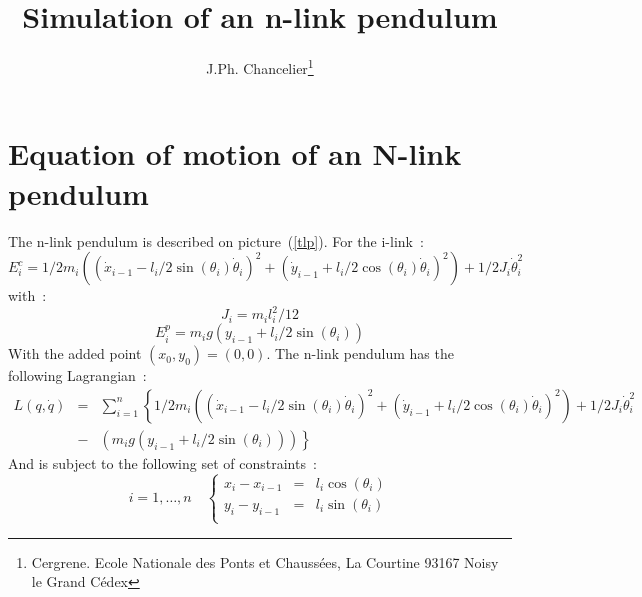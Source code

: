              \textheight=660pt 
             \textwidth=15cm
             \topmargin=-27pt 
             \oddsidemargin=0.7cm
             \evensidemargin=0.7cm
             \marginparwidth=60pt
             \title{Simulation of an n-link pendulum} 
             \author{J.Ph. Chancelier\thanks{Cergrene. Ecole Nationale des Ponts et Chauss\'ees, La Courtine  93167 Noisy le Grand C\'{e}dex }}
 
\maketitle

\def\tenrm{\size{10}{11pt}\shape{n}\family{cmr}\selectfont} 
\def\elvrm{\size{11}{12pt}\shape{n}\family{cmr}\selectfont} 
\def\sixrm{\size{6}{7pt}\shape{n}\family{cmr}\selectfont} 
\def\sevrm{\size{7}{8pt}\shape{n}\family{cmr}\selectfont} 
\def\dotx{\dot{x}}
\def\doty{\dot{y}}
\def\dotq{\dot{q}}
\def\dotth{\dot{\theta}}



\section{Equation of motion of an N-link pendulum}
The n-link pendulum is described on picture~(\ref{tlp}).
For the i-link~:
\begin{equation}
	E_i^c = 
	 1/2 m_i \left( (\dotx_{i-1} - l_i/2 \sin(\theta_i)\dotth_i)^2 +
	(\doty_{i-1}+ l_i/2 \cos(\theta_i)\dotth_i)^2 \right)
	+1/2 J_i \dot{\theta}_i^2
\end{equation}
with~:
\begin{equation}
	J_i= m_i l_i^2/12 
\end{equation}
\begin{equation}
	E_i^p= m_i g \left( y_{i-1} + l_i/2 \sin(\theta_i)\right)
\end{equation}
With the added point $(x_0,y_0)=(0,0)$.
The n-link pendulum has the following Lagrangian~:
\begin{eqnarray}
	L(q,\dot{q})&=& 
	\sum_{i=1}^n \left\{
	 1/2 m_i \left( (\dotx_{i-1} - l_i/2 \sin(\theta_i)\dotth_i)^2 +
	(\doty_{i-1}+ l_i/2 \cos(\theta_i)\dotth_i)^2 \right)
	+1/2 J_i \dot{\theta}_i^2 \right.\\
	&-& \left. \left( m_i g \left( y_{i-1} + l_i/2 \sin(\theta_i)\right)\right)
	\right\}
\end{eqnarray}
And is subject to the following set of constraints~:
\begin{equation}
	i=1,\ldots,n \quad \left\{
	\begin{array}{lcl}
	 x_i -x_{i-1} &=& l_i \cos(\theta_i) \\
	 y_i -y_{i-1} &=& l_i \sin(\theta_i) \\
	\end{array} \right.
\label{const}
\end{equation}

